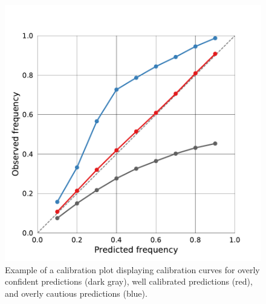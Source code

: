 \documentclass[journal abbreviation, manuscript]{copernicus}
\begin{document}
\begin{figure}[hbpt!]
  \centering
  \includegraphics[width = 0.5\linewidth]{../plots/fig01}
  \caption{Example of a calibration plot displaying calibration curves for
           overly confident predictions (dark gray), well calibrated predictions (red),
           and overly cautious predictions (blue).}
  \label{fig:calibration_plot_example}
\end{figure}
\end{document}
